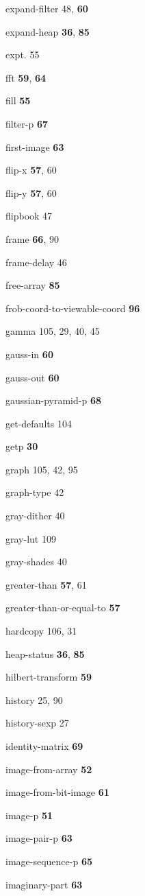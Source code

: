 \begin{theindex}
\item expand-filter 48, {\bf 60}
\item expand-heap {\bf 36}, {\bf 85}
\item expt. 55
\item fft {\bf 59}, {\bf 64}
\item fill {\bf 55}
\item filter-p {\bf 67}
\item first-image {\bf 63}
\item flip-x {\bf 57}, 60
\item flip-y {\bf 57}, 60
\item flipbook 47
\item frame {\bf 66}, 90
\item frame-delay 46
\item free-array {\bf 85}
\item frob-coord-to-viewable-coord {\bf 96}
\item gamma 105, 29, 40, 45
\item gauss-in {\bf 60}
\item gauss-out {\bf 60}
\item gaussian-pyramid-p {\bf 68}
\item get-defaults 104
\item getp {\bf 30}
\item graph 105, 42, 95
\item graph-type 42
\item gray-dither 40
\item gray-lut 109
\item gray-shades 40
\item greater-than {\bf 57}, 61
\item greater-than-or-equal-to {\bf 57}
\item hardcopy 106, 31
\item heap-status {\bf 36}, {\bf 85}
\item hilbert-transform {\bf 59}
\item history 25, 90
\item history-sexp 27
\item identity-matrix {\bf 69}
\item image-from-array {\bf 52}
\item image-from-bit-image {\bf 61}
\item image-p {\bf 51}
\item image-pair-p {\bf 63}
\item image-sequence-p {\bf 65}
\item imaginary-part {\bf 63}

\end{theindex}
